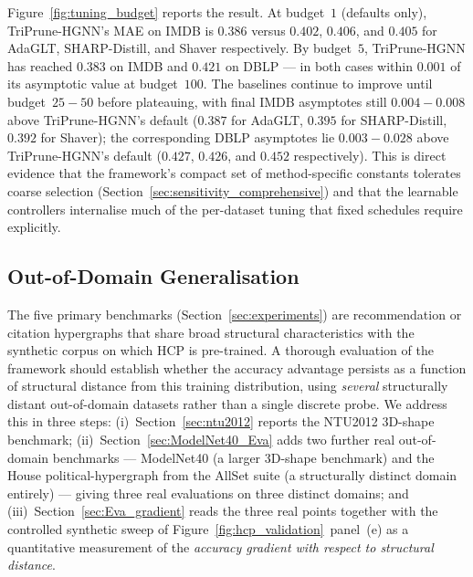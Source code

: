 \documentclass[10pt]{article}
\theoremstyle{plain}
\theoremstyle{definition}
\begin{document}
Figure~\ref{fig:tuning_budget} reports the result. At budget~$1$ (defaults only), TriPrune-HGNN's MAE on IMDB is $0.386$ versus $0.402$, $0.406$, and $0.405$ for AdaGLT, SHARP-Distill, and Shaver respectively.  
By budget~$5$, TriPrune-HGNN has reached $0.383$ on IMDB and $0.421$ on DBLP --- in both cases within $0.001$ of its asymptotic value at budget~$100$. The baselines continue to improve until budget~$25\!-\!50$ before plateauing, with final IMDB asymptotes still $0.004\!-\!0.008$ above TriPrune-HGNN's default ($0.387$ for AdaGLT, $0.395$ for SHARP-Distill, $0.392$ for Shaver); the corresponding DBLP asymptotes lie $0.003\!-\!0.028$ above TriPrune-HGNN's default ($0.427$, $0.426$, and $0.452$ respectively). 
This is direct evidence that the framework's compact set of method-specific constants tolerates coarse selection (Section~\ref{sec:sensitivity_comprehensive}) and that the learnable controllers internalise much of the per-dataset tuning that fixed schedules require explicitly.

\subsection{Out-of-Domain Generalisation}
\label{sec:Out-of-Domain}

The five primary benchmarks (Section~\ref{sec:experiments}) are recommendation or citation hypergraphs that share broad structural characteristics with the synthetic corpus on which HCP is pre-trained. A thorough evaluation of the framework should establish whether the accuracy advantage persists as a function of structural distance from this training distribution, using \emph{several} structurally distant out-of-domain datasets rather than a single discrete probe. We address this in three steps: (i)~Section~\ref{sec:ntu2012} reports the NTU2012 3D-shape benchmark; (ii)~Section~\ref{sec:ModelNet40_Eva} adds two further real out-of-domain benchmarks --- ModelNet40 (a larger 3D-shape benchmark) and the House political-hypergraph from the AllSet suite (a structurally distinct domain entirely) --- giving three real evaluations on three distinct domains; and (iii)~Section~\ref{sec:Eva_gradient} reads the three real points together with the controlled synthetic sweep of Figure~\ref{fig:hcp_validation}~panel~(e) as a quantitative measurement of the \emph{accuracy gradient with respect to structural distance}.
\end{document}
